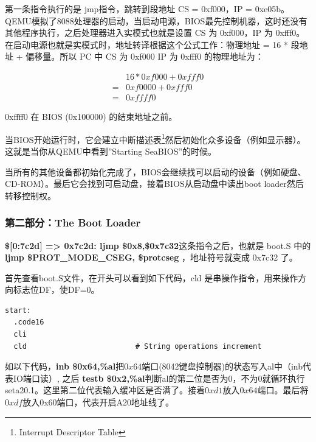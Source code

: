 \begin{ExerciseList}
第一条指令执行的是 jmp指令，跳转到段地址 CS = 0xf000，IP = 0xe05b。QEMU模拟了8088处理器的启动，当启动电源，BIOS最先控制机器，这时还没有其他程序执行，之后处理器进入实模式也就是设置 CS 为 0xf000，IP 为 0xfff0。在启动电源也就是实模式时，地址转译根据这个公式工作：物理地址 = 16 * 段地址 + 偏移量。所以 PC 中 CS 为 0xf000 IP 为 0xfff0 的物理地址为：

\begin{align}
   & 16 * 0xf000 + 0xfff0\\
   = & 0xf0000 + 0xfff0\\
   = & 0xffff0
\end{align}

0xffff0 在 BIOS (0x100000) 的结束地址之前。

当BIOS开始运行时，它会建立中断描述表\footnote{Interrupt Descriptor Table}然后初始化众多设备（例如显示器）。这就是当你从QEMU中看到''Starting SeaBIOS''的时候。

当所有的其他设备都初始化完成了，BIOS会继续找可以启动的设备（例如硬盘、CD-ROM）。最后它会找到可启动盘，接着BIOS从启动盘中读出boot loader然后转移控制权。

\subsubsection{第二部分：The Boot Loader}


\textbf{\$[0:7c2d] => 0x7c2d: ljmp \$0x8,\$0x7c32}这条指令之后，也就是 boot.S 中的\textbf{ ljmp \$PROT\_MODE\_CSEG, \$protcseg} ，地址符号就变成 0x7c32 了。

首先查看boot.S文件，在开头可以看到如下代码，cld 是串操作指令，用来操作方向标志位DF，使DF=0。

\begin{verbatim}
start:
  .code16
  cli
  cld                         # String operations increment
\end{verbatim}

如以下代码，\textbf{inb \$0x64,\%al}把$0x64$端口(8042键盘控制器)的状态写入al中（inb代表IO端口读）, 之后 \textbf{testb \$0x2,\%al}判断al的第二位是否为0，不为0就循环执行seta20.1。这里第二位代表输入缓冲区是否满了。接着$0xd1$放入$0x64$端口。最后将$0xdf$放入0x60端口，代表开启A20地址线了。


\end{ExerciseList}
